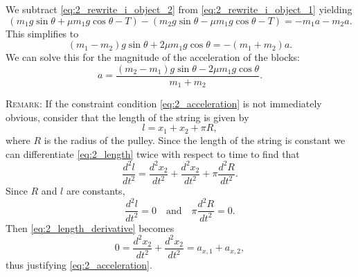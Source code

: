 \documentclass{esg8012exam}
\begin{document}
\begin{solution}
  We subtract \autoref{eq:2_rewrite_i_object_2} from \autoref{eq:2_rewrite_i_object_1} yielding
  \begin{equation}
    (m_1 g \sin\theta + \mu m_1 g \cos\theta - T) - (m_2 g \sin\theta - \mu m_1 g \cos\theta - T) = -m_1 a - m_2 a.
  \end{equation}
  This simplifies to
  \begin{equation}
    (m_1 - m_2) g \sin\theta + 2\mu m_1 g \cos\theta = -(m_1 + m_2) a.
  \end{equation}
  We can solve this for the magnitude of the acceleration of the blocks:
  \begin{equation}
    a = \frac{(m_2 - m_1) g \sin\theta - 2\mu m_1 g \cos\theta}{m_1 + m_2}.
  \end{equation}
  
  \textsc{Remark}: If the constraint condition \autoref{eq:2_acceleration} is not immediately obvious, consider that the length of the string is given by
  \begin{equation}
    l = x_1 + x_2 + \pi R,\label{eq:2_length}
  \end{equation}
  where $R$ is the radius of the pulley.  Since the length of the string is constant we can differentiate \autoref{eq:2_length} twice with respect to time to find that
  \begin{equation}
    \frac{d^2l}{dt^2} = \frac{d^2x_2}{dt^2} + \frac{d^2x_2}{dt^2} + \pi \frac{d^2R}{dt^2}. \label{eq:2_length_derivative}
  \end{equation}
  Since $R$ and $l$ are constants,
  \begin{equation}
    \frac{d^2l}{dt^2} = 0\quad\text{and}\quad\pi\frac{d^2R}{dt^2} = 0.
  \end{equation}
  Then \autoref{eq:2_length_derivative} becomes
  \begin{equation}
    0 = \frac{d^2x_2}{dt^2} + \frac{d^2x_2}{dt^2} = a_{x, 1} + a_{x, 2},
  \end{equation}
  thus justifying \autoref{eq:2_acceleration}.
\end{solution}



\clearpage
\end{document}
